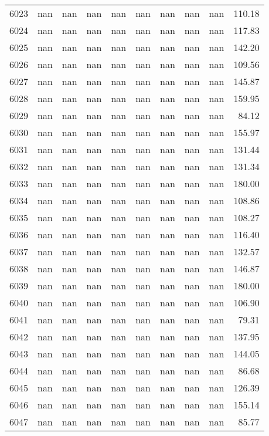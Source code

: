 \begin{tabular}{lrrrrrrrrr}
6023 & nan & nan & nan & nan & nan & nan & nan & nan & 110.18 \\
6024 & nan & nan & nan & nan & nan & nan & nan & nan & 117.83 \\
6025 & nan & nan & nan & nan & nan & nan & nan & nan & 142.20 \\
6026 & nan & nan & nan & nan & nan & nan & nan & nan & 109.56 \\
6027 & nan & nan & nan & nan & nan & nan & nan & nan & 145.87 \\
6028 & nan & nan & nan & nan & nan & nan & nan & nan & 159.95 \\
6029 & nan & nan & nan & nan & nan & nan & nan & nan & 84.12 \\
6030 & nan & nan & nan & nan & nan & nan & nan & nan & 155.97 \\
6031 & nan & nan & nan & nan & nan & nan & nan & nan & 131.44 \\
6032 & nan & nan & nan & nan & nan & nan & nan & nan & 131.34 \\
6033 & nan & nan & nan & nan & nan & nan & nan & nan & 180.00 \\
6034 & nan & nan & nan & nan & nan & nan & nan & nan & 108.86 \\
6035 & nan & nan & nan & nan & nan & nan & nan & nan & 108.27 \\
6036 & nan & nan & nan & nan & nan & nan & nan & nan & 116.40 \\
6037 & nan & nan & nan & nan & nan & nan & nan & nan & 132.57 \\
6038 & nan & nan & nan & nan & nan & nan & nan & nan & 146.87 \\
6039 & nan & nan & nan & nan & nan & nan & nan & nan & 180.00 \\
6040 & nan & nan & nan & nan & nan & nan & nan & nan & 106.90 \\
6041 & nan & nan & nan & nan & nan & nan & nan & nan & 79.31 \\
6042 & nan & nan & nan & nan & nan & nan & nan & nan & 137.95 \\
6043 & nan & nan & nan & nan & nan & nan & nan & nan & 144.05 \\
6044 & nan & nan & nan & nan & nan & nan & nan & nan & 86.68 \\
6045 & nan & nan & nan & nan & nan & nan & nan & nan & 126.39 \\
6046 & nan & nan & nan & nan & nan & nan & nan & nan & 155.14 \\
6047 & nan & nan & nan & nan & nan & nan & nan & nan & 85.77 \\

\end{tabular}
